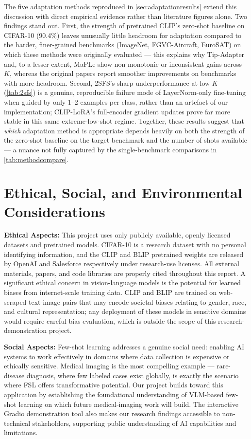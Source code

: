 \documentclass{iutbscthesis}
\begin{document}
The five adaptation methods reproduced in \autoref{sec:adaptationresults} extend this discussion with direct empirical evidence rather than literature figures alone. Two findings stand out. First, the strength of pretrained CLIP's zero-shot baseline on CIFAR-10 (90.4\%) leaves unusually little headroom for adaptation compared to the harder, finer-grained benchmarks (ImageNet, FGVC-Aircraft, EuroSAT) on which these methods were originally evaluated --- this explains why Tip-Adapter and, to a lesser extent, MaPLe show non-monotonic or inconsistent gains across $K$, whereas the original papers report smoother improvements on benchmarks with more headroom. Second, 2SFS's sharp underperformance at low $K$ (\autoref{tab:2sfs}) is a genuine, reproducible failure mode of LayerNorm-only fine-tuning when guided by only 1--2 examples per class, rather than an artefact of our implementation; CLIP-LoRA's full-encoder gradient updates prove far more stable in this same extreme-low-shot regime. Together, these results suggest that \emph{which} adaptation method is appropriate depends heavily on both the strength of the zero-shot baseline on the target benchmark and the number of shots available --- a nuance not fully captured by the single-benchmark comparisons in \autoref{tab:methodcompare}.

\chapter{Ethical, Social, and Environmental Considerations}

\textbf{Ethical Aspects:}
This project uses only publicly available, openly licensed datasets and pretrained models. CIFAR-10 is a research dataset with no personal identifying information, and the CLIP and BLIP pretrained weights are released by OpenAI and Salesforce respectively under research-use licenses. All external materials, papers, and code libraries are properly cited throughout this report. A significant ethical concern in vision-language models is the potential for learned biases from internet-scale training data. CLIP and BLIP are trained on web-scraped text-image pairs that may encode societal biases relating to gender, race, and cultural representation; any deployment of these models in sensitive domains would require careful bias evaluation, which is outside the scope of this research-demonstration project.

\textbf{Social Aspects:}
Few-shot learning addresses a genuine social need: enabling AI systems to work effectively in domains where data collection is expensive or ethically sensitive. Medical imaging is the most compelling example --- rare-disease diagnosis, where few labeled cases exist globally, is exactly the scenario where FSL offers transformative potential. Our project builds toward this application by establishing the foundational understanding of VLM-based few-shot learning on which future medical-imaging work will build. The interactive Gradio demonstration tool also makes our research findings accessible to non-technical stakeholders, supporting public understanding of AI capabilities and limitations.
\end{document}
